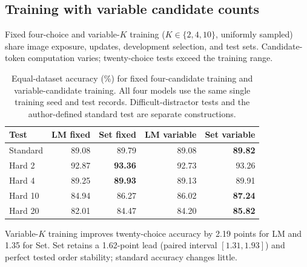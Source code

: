 \subsection{Training with variable candidate counts}
\label{sec:dynamic-k-training}
Fixed four-choice and variable-$K$ training ($K\in\{2,4,10\}$, uniformly sampled) share image exposure, updates, development selection, and test sets. Candidate-token computation varies; twenty-choice tests exceed the training range.
\begin{table}[htbp]
\centering\small
\begin{tabular}{lrrrr}
\toprule
Test & LM fixed & Set fixed & LM variable & Set variable \\
\midrule
Standard & 89.08 & 89.79 & 89.08 & \textbf{89.82} \\
Hard 2 & 92.87 & \textbf{93.36} & 92.73 & 93.26 \\
Hard 4 & 89.25 & \textbf{89.93} & 89.13 & 89.91 \\
Hard 10 & 84.94 & 86.27 & 86.02 & \textbf{87.24} \\
Hard 20 & 82.01 & 84.47 & 84.20 & \textbf{85.82} \\
\bottomrule
\end{tabular}
\caption{Equal-dataset accuracy (\%) for fixed four-candidate training and variable-candidate training. All four models use the same single training seed and test records. Difficult-distractor tests and the author-defined standard test are separate constructions.}
\label{tab:dynamic-k-training}
\end{table}
Variable-$K$ training improves twenty-choice accuracy by 2.19 points for LM and 1.35 for Set. Set retains a 1.62-point lead (paired interval $[1.31,1.93]$) and perfect tested order stability; standard accuracy changes little.
